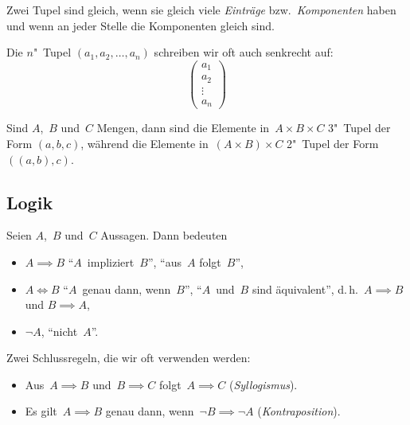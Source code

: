 \documentclass[a4paper]{article}
\begin{document}
\begin{remark}
    Zwei Tupel sind gleich, wenn sie gleich viele \emph{Einträge} bzw.\ \emph{Komponenten} haben und wenn an jeder Stelle die Komponenten gleich sind.
\end{remark}

\begin{notation}
    Die $n$"~Tupel $(a_1, a_2, \dots, a_n)$ schreiben wir oft auch senkrecht auf:
    \begin{equation*}
        \begin{pmatrix}
            a_1 \\ a_2 \\ \vdots \\ a_n
        \end{pmatrix}
    \end{equation*}
\end{notation}

\begin{example}
    Sind $A$,~$B$ und~$C$ Mengen, dann sind die Elemente in~$A \times B \times C$ 3"~Tupel der Form $(a, b, c)$, während die Elemente in~$(A \times B) \times C$ 2"~Tupel der Form $((a, b), c)$.
\end{example}

\subsection{Logik}

\begin{definition}
    Seien $A$,~$B$ und~$C$ Aussagen. Dann bedeuten
    \begin{itemize}
        \item $A \implies B$ "`$A$~impliziert~$B$"', "`aus~$A$ folgt~$B$"',
        \item $A \iff B$ "`$A$~genau dann, wenn~$B$"', "`$A$~und~$B$ sind äquivalent"', d.\,h.\ $A \implies B$ und $B \implies A$,
        \item $\neg A$, "`nicht~$A$"'.
    \end{itemize}
\end{definition}

Zwei Schlussregeln, die wir oft verwenden werden:

\begin{theorem}\label{thm:deductionrules}\leavevmode
    \begin{itemize}
        \item Aus~$A \implies B$ und~$B \implies C$ folgt~$A \implies C$ (\emph{Syllogismus}).
        \item Es gilt~$A \implies B$ genau dann, wenn~$\neg B \implies \neg A$ (\emph{Kontraposition}).
    \end{itemize}
\end{theorem}
\end{document}
